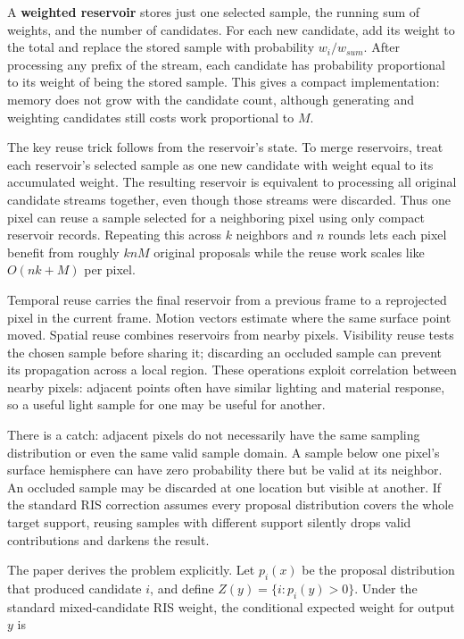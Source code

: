 A \textbf{weighted reservoir} stores just one selected sample, the running sum of weights, and the number of candidates. For each new candidate, add its weight to the total and replace the stored sample with probability \(w_i/w_{sum}\). After processing any prefix of the stream, each candidate has probability proportional to its weight of being the stored sample. This gives a compact implementation: memory does not grow with the candidate count, although generating and weighting candidates still costs work proportional to \(M\).

The key reuse trick follows from the reservoir's state. To merge reservoirs, treat each reservoir's selected sample as one new candidate with weight equal to its accumulated weight. The resulting reservoir is equivalent to processing all original candidate streams together, even though those streams were discarded. Thus one pixel can reuse a sample selected for a neighboring pixel using only compact reservoir records. Repeating this across \(k\) neighbors and \(n\) rounds lets each pixel benefit from roughly \(knM\) original proposals while the reuse work scales like \(O(nk+M)\) per pixel.

Temporal reuse carries the final reservoir from a previous frame to a reprojected pixel in the current frame. Motion vectors estimate where the same surface point moved. Spatial reuse combines reservoirs from nearby pixels. Visibility reuse tests the chosen sample before sharing it; discarding an occluded sample can prevent its propagation across a local region. These operations exploit correlation between nearby pixels: adjacent points often have similar lighting and material response, so a useful light sample for one may be useful for another.

There is a catch: adjacent pixels do not necessarily have the same sampling distribution or even the same valid sample domain. A sample below one pixel's surface hemisphere can have zero probability there but be valid at its neighbor. An occluded sample may be discarded at one location but visible at another. If the standard RIS correction assumes every proposal distribution covers the whole target support, reusing samples with different support silently drops valid contributions and darkens the result.

The paper derives the problem explicitly. Let \(p_i(x)\) be the proposal distribution that produced candidate \(i\), and define \(Z(y)=\{i:p_i(y)>0\}\). Under the standard mixed-candidate RIS weight, the conditional expected weight for output \(y\) is

